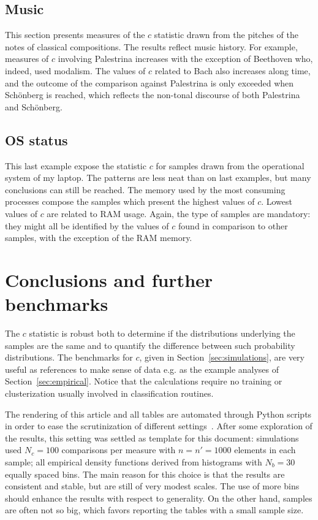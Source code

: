 \documentclass[%
	aip,
	jmp,%
	amsmath,amssymb,
	reprint,%
]{revtex4-1}
\begin{document}
\subsection{Music}
This section presents measures of the $c$ statistic drawn
from the pitches of the notes of classical compositions.
The results reflect music history.
For example, measures of $c$ involving Palestrina
increases with the exception of Beethoven
who, indeed, used modalism.
The values of $c$ related to Bach also increases along time,
and the outcome of the comparison against Palestrina 
is only exceeded when Sch\"onberg is reached,
which reflects the non-tonal discourse of both
Palestrina and Sch\"onberg.





\FloatBarrier
\subsection{OS status}
This last example expose the statistic $c$ for samples drawn from
the operational system of my laptop.
The patterns are less neat than on last examples,
but many conclusions can still be reached.
The memory used by the most consuming processes compose
the samples which present the highest values of $c$.
Lowest values of $c$ are related to RAM usage.
Again, the type of samples are mandatory:
they might all be identified by the values of $c$
found in comparison to other samples,
with the exception of the RAM memory.



\FloatBarrier
\section{Conclusions and further benchmarks}\label{sec:conc}
The $c$ statistic is robust both to determine if
the distributions underlying the samples are the same
and to quantify the difference between such probability distributions.
The benchmarks for $c$, given in Section~\ref{sec:simulations},
are very useful as references to make sense of data 
e.g. as the example analyses of Section~\ref{sec:empirical}.
Notice that the calculations require no
training or clusterization usually involved in
classification routines.

The rendering of this article and all tables
are automated through Python scripts
in order to ease the scrutinization of different settings~\cite{gmanePack}.
After some exploration of  the results,
this setting was settled as template for this document:
simulations used $N_c=100$ comparisons per measure with
$n=n'=1000$ elements in each sample;
all empirical density functions
derived from histograms with 
$N_b=30$ equally spaced bins.
The main reason for this choice is that
the results are consistent and stable,
but are still of very modest scales.
The use of more bins 
should enhance the results with respect to generality.
On the other hand, samples are often not so big,
which favors reporting the tables with a small sample size.
\end{document}
